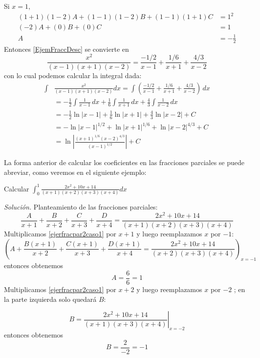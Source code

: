 Si $x=1$,
\begin{align*}
(1+1)(1-2)A+(1-1)(1-2)B+(1-1)(1+1)C&=1^{2} \\
(-2)A+(0)B+(0)C&=1 \\
A&=-\frac{1}{2}
\end{align*}
Entonces \eqref{EjemFraccDesc} se convierte en
\[
\frac{x^{2}}{(x-1)(x+1)(x-2)}=\frac{-1/2}{x-1}+\frac{1/6}{x+1}+\frac{4/3}{x-2}
\]
con lo cual podemos calcular la integral dada:
\begin{align*}
\int &\frac{x^{2}}{(x-1)(x+1)(x-2)}dx=\int\left( \frac{-1/2}{x-1}+\frac{1/6}{x+1}+\frac{4/3}{x-2}\right)\, dx \\
 &=-\frac{1}{2}\int \frac{1}{x-1}\, dx + \frac{1}{6}\int\frac{1}{x+1}\, dx +\frac{4}{3}\int\frac{1}{x-2}\, dx \\
 &=-\frac{1}{2}\ln\vert x-1 \vert+\frac{1}{6}\ln\vert x+1 \vert+\frac{4}{3}\ln\vert x-2\vert+C \\
 &=-\ln\vert x-1 \vert^{1/2}+\ln\vert x+1 \vert^{1/6}+\ln\vert x-2\vert^{4/3}+C \\
 &=\ln\left\vert\frac{(x+1)^{1/6}(x-2)^{4/3}}{(x-1)^{1/2}} \right\vert+C
\end{align*}

La forma anterior de calcular los coeficientes en las fracciones parciales
se puede abreviar, como veremos en el siguiente ejemplo:

\begin{ejemplo}
\textnormal{Calcular} $\displaystyle\int_{0}^{1}\frac{2x^{2}+10x+14}{\left( x+1\right) \left(
x+2\right) \left( x+3\right) \left( x+4\right) }dx$
\end{ejemplo}
\textit{Solución.} Planteamiento de las fracciones parciales:
\begin{equation}\label{ejerfracpar2caso1}
\frac{A}{x+1}+\frac{B}{x+2}+\frac{C}{x+3}+\frac{D}{x+4}=\frac{2x^{2}+10x+14%
}{\left( x+1\right) \left( x+2\right) \left( x+3\right) \left( x+4\right) }
\end{equation}
Multiplicamos \ref{ejerfracpar2caso1} por $x+1$ y luego reemplazamos $x$ por $-1:$
$$\left( A+\frac{B\left( x+1\right) }{x+2}+\frac{C\left( x+1\right) }{x+3}+%
\frac{D\left( x+1\right) }{x+4}=\frac{2x^{2}+10x+14}{\left( x+2\right)
\left( x+3\right) \left( x+4\right) }\right) _{x=-1}$$
entonces obtenemos
$$A=\frac{6}{6}=1$$
Multiplicamos \ref{ejerfracpar2caso1} por $x+2$ y luego reemplazamos $x$ por $-2$%
; en la parte izquierda solo quedará $B$:

$$B=\left. \frac{2x^{2}+10x+14}{\left( x+1\right) \left( x+3\right) \left(
x+4\right) }\right\vert _{x=-2}$$
entonces obtenemos $$B=\frac{2}{-2}=-1$$


